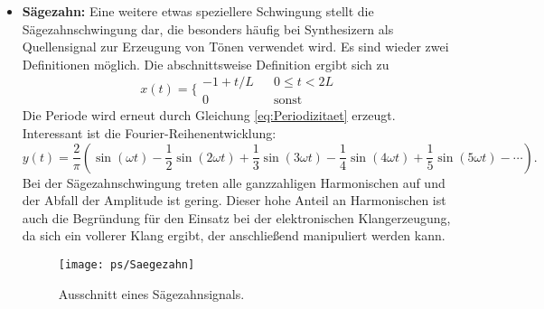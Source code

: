 \begin{itemize}
{}
\item{
{\bf Sägezahn:} Eine weitere etwas speziellere Schwingung stellt die Sägezahnschwingung dar, die
besonders häufig bei Synthesizern als Quellensignal zur Erzeugung von Tönen verwendet wird.
Es sind wieder zwei Definitionen möglich.
Die abschnittsweise Definition ergibt sich zu
\begin{equation}
x(t) =\bigg\{ \begin{array}{lcc}
-1+ t/L & &  0 \leq t < 2L\\
0 & & \mbox{sonst}
\end{array}
\end{equation}
Die Periode wird erneut durch Gleichung \ref{eq:Periodizitaet} erzeugt.
Interessant ist die Fourier-Reihenentwicklung:
\begin{equation}
y(t) = \frac{2}{\pi}\left(\sin(\omega t) - \frac{1}{2} \sin(2\omega t) + \frac{1}{3} \sin(3\omega t)
- \frac{1}{4} \sin(4\omega t) + \frac{1}{5} \sin(5 \omega t) - \cdots\right).
\end{equation}
Bei der Sägezahnschwingung treten alle ganzzahligen Harmonischen auf und der Abfall der Amplitude ist gering.
Dieser hohe Anteil an Harmonischen ist auch die Begründung
für den Einsatz bei der elektronischen Klangerzeugung, da sich ein vollerer Klang ergibt, der anschließend manipuliert werden kann.
\begin{figure}[h]
\begin{center}
\texttt{[image: ps/Saegezahn]}
\caption{\label{pic:SaegezahnFunktion} Ausschnitt eines Sägezahnsignals.}
\end{center}
\end{figure}
}
\end{itemize}


